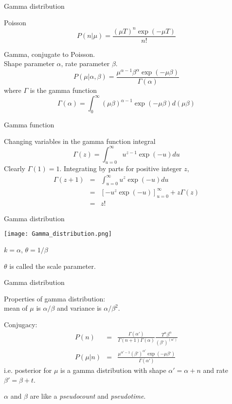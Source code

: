 \documentclass{beamer}
\begin{document}
\begin{frame}{Gamma distribution}

\itemb
 \item Poisson
\[
P(n|\mu) = \frac{(\mu T)^n \exp(-\mu T)}{n!}
\]
 \item Gamma, conjugate to Poisson. \\
Shape parameter $\alpha$, rate parameter $\beta$.
\[
P(\mu|\alpha,\beta) = \frac{\mu^{\alpha-1} \beta^\alpha \exp(-\mu \beta)}{\Gamma(\alpha)}
\]
where $\Gamma$ is the \alert{gamma function}
\[
\Gamma(\alpha) = \int_0^{\infty} (\mu\beta)^{\alpha-1} \exp(-\mu \beta) d(\mu \beta)
\]
\iteme


\end{frame}


\begin{frame}{Gamma function}

Changing variables in the gamma function integral
\[
\Gamma(z) = \int_{u=0}^\infty u^{z-1} \exp(-u) du
\]
Clearly $\Gamma(1)=1$. Integrating by parts for positive integer $z$,
\begin{eqnarray*}
\Gamma(z+1) & = & \int_{u=0}^\infty u^z \exp(-u) du \\
& = & \left[ -u^z \exp(-u) \right]_{u=0}^\infty + z \Gamma(z) \\
& = & z!
\end{eqnarray*}


\end{frame}

\begin{frame}{Gamma distribution}

  \texttt{[image: Gamma\_distribution.png]}

$k=\alpha$, $\theta = 1/\beta$

$\theta$ is called the scale parameter.

\end{frame}

\begin{frame}{Gamma distribution}

\itemb
 \item Properties of gamma distribution: \\ mean of $\mu$ is $\alpha/\beta$ and variance is $\alpha/\beta^2$.
 \item Conjugacy:
\begin{eqnarray*}
P(n) & = & \frac{\Gamma(\alpha')}{\Gamma(n+1)\Gamma(\alpha)} \frac{T^n \beta^\alpha}{(\beta')^{(\alpha')}} \\
P(\mu|n) & = & \frac{\mu^{\alpha'-1} (\beta')^{\alpha'} \exp(-\mu \beta')}{\Gamma(\alpha')}
\end{eqnarray*}
i.e. posterior for $\mu$ is a gamma distribution with shape $\alpha' = \alpha + n$ and rate $\beta' = \beta + t$.
\item $\alpha$ and $\beta$ are like a {\em pseudocount} and {\em pseudotime}.
\iteme


\end{frame}
\end{document}
